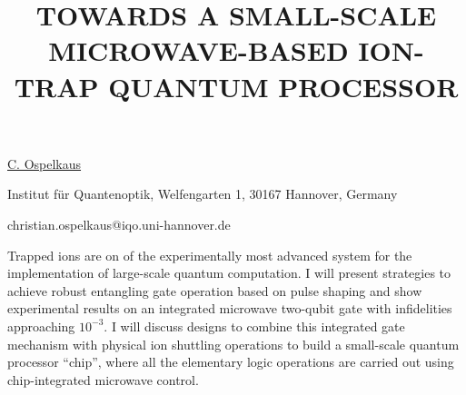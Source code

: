 \title{TOWARDS A SMALL-SCALE MICROWAVE-BASED ION-TRAP QUANTUM PROCESSOR}

\underline{C. Ospelkaus} 

{\normalsize{\vspace{-4mm}
Institut für Quantenoptik,
Welfengarten 1,
30167 Hannover,
Germany



\email christian.ospelkaus@iqo.uni-hannover.de}}

Trapped ions are on of the experimentally most advanced system for the implementation of large-scale quantum computation. I will present strategies to achieve robust entangling gate operation based on pulse shaping and show experimental results on an integrated microwave two-qubit gate with infidelities approaching $10^{-3}$. I will discuss designs to combine this integrated gate mechanism with physical ion shuttling operations to build a small-scale quantum processor ``chip'', where all the elementary logic operations are carried out using chip-integrated microwave control.

\vspace{\baselineskip}